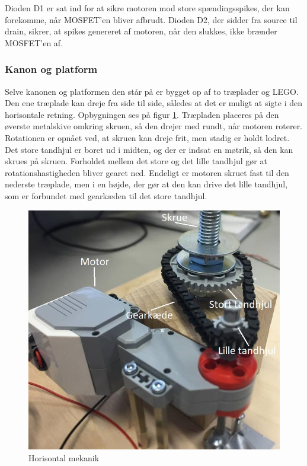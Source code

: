 Dioden D1 er sat ind for at sikre motoren mod store spændingsspikes, der kan forekomme, når MOSFET'en bliver afbrudt. Dioden D2, der sidder fra source til drain, sikrer, at spikes genereret af motoren, når den slukkes, ikke brænder MOSFET'en af. 

\subsubsection{Kanon og platform}
Selve kanonen og platformen den står på er bygget op af to træplader og LEGO. Den ene træplade kan dreje fra side til side, således at det er muligt at sigte i den horisontale retning. Opbygningen ses på figur \ref{fig:Horisontalmekanik}. Træpladen placeres på den øverste metalskive omkring skruen, så den drejer med rundt, når motoren roterer. Rotationen er opnået ved, at skruen kan dreje frit, men stadig er holdt lodret. Det store tandhjul er boret ud i midten, og der er indsat en møtrik, så den kan skrues på skruen. Forholdet mellem det store og det lille tandhjul gør at rotationshastigheden bliver gearet ned. Endeligt er motoren skruet fast til den nederste træplade, men i en højde, der gør at den kan drive det lille tandhjul, som er forbundet med gearkæden til det store tandhjul. 

\begin{figure}[H]
	\centering
	\includegraphics[width=1\textwidth]{Afsnit/DesignOgImplementering/images/horisontalMekanik}
	\caption{Horisontal mekanik}
	\label{fig:Horisontalmekanik}
\end{figure}

